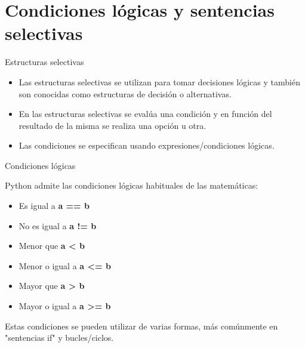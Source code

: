 
\section{Condiciones lógicas y sentencias selectivas}

\begin{frame}[c]{Estructuras selectivas}
  \begin{itemize}
    \item Las estructuras selectivas se utilizan para tomar decisiones
      lógicas y también son conocidas como estructuras de decisión o
      alternativas.
    \pausa
    \item En las estructuras selectivas se evalúa una condición y en
      función del resultado de la misma se realiza una opción u otra.
    \pausa
    \item Las condiciones se especifican usando expresiones/condiciones lógicas.
  \end{itemize}
\end{frame}

\begin{frame}[c]{Condiciones lógicas}

  Python admite las condiciones lógicas habituales de las matemáticas:

  \vspace{\baselineskip}
  \begin{itemize}
    \item Es igual a \textbf{a == b}
    \pausa
    \item No es igual a \textbf{a != b}
    \pausa
    \item Menor que \textbf{a < b}
    \pausa
    \item Menor o igual a \textbf{a <= b}
    \pausa
    \item Mayor que \textbf{a > b}
    \pausa
    \item Mayor o igual a \textbf{a >= b}
  \end{itemize}

  \vspace{\baselineskip}
  Estas condiciones se pueden utilizar de varias formas, más
  comúnmente en "sentencias \textcolor{codeKeyword}{if}" y bucles/ciclos.
\end{frame}

